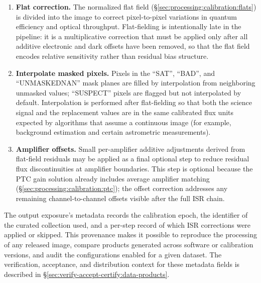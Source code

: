 \begin{enumerate}
    Since the variance plane is used to estimate the uncertainty on just the charge accumulated in the image, it needs to be computed before flat-field correcting.

    \item \textbf{Flat correction.}
    The normalized flat field (\S\ref{sec:processing:calibration:flats}) is divided into the image to correct pixel-to-pixel variations in quantum efficiency and optical throughput.
    Flat-fielding is intentionally late in the pipeline: it is a multiplicative correction that must be applied only after all additive electronic and dark offsets have been removed, so that the flat field encodes relative sensitivity rather than residual bias structure.

    \item \textbf{Interpolate masked pixels.}
    Pixels in the ``SAT'', ``BAD'', and ``UNMASKEDNAN'' mask planes are filled by interpolation from neighboring unmasked values; ``SUSPECT'' pixels are flagged but not interpolated by default.
    Interpolation is performed after flat-fielding so that both the science signal and the replacement values are in the same calibrated flux units expected by algorithms that assume a continuous image (for example, background estimation and certain astrometric measurements).

    \item \textbf{Amplifier offsets.}
    Small per-amplifier additive adjustments derived from flat-field residuals may be applied as a final optional step to reduce residual flux discontinuities at amplifier boundaries. 
    This step is optional because the PTC gain solution already includes average amplifier matching (\S\ref{sec:processing:calibration:ptc}); the offset correction addresses any remaining channel-to-channel offsets visible after the full ISR chain.
\end{enumerate}

The output exposure's metadata records the calibration epoch, the identifier of the curated collection used, and a per-step record of which ISR corrections were applied or skipped.
This provenance makes it possible to reproduce the processing of any released image, compare products generated across software or calibration versions, and audit the configurations enabled for a given dataset.
The verification, acceptance, and distribution context for these metadata fields is described in \S\ref{sec:verify-accept-certify:data-products}.

